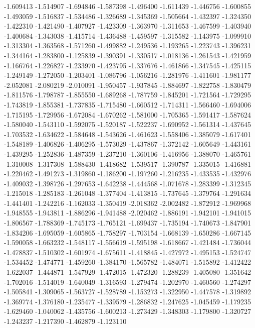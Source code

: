 -1.609413
-1.514907
-1.694846
-1.587398
-1.496400
-1.611439
-1.446756
-1.600855
-1.493059
-1.516837
-1.534486
-1.326689
-1.345369
-1.505664
-1.432397
-1.324350
-1.422310
-1.421490
-1.407927
-1.423309
-1.363970
-1.311653
-1.467599
-1.403940
-1.400684
-1.343038
-1.415714
-1.436488
-1.459597
-1.315582
-1.143975
-1.099910
-1.313304
-1.363568
-1.571260
-1.499882
-1.249536
-1.193265
-1.223743
-1.396231
-1.344164
-1.283800
-1.125839
-1.390391
-1.330517
-1.018136
-1.261543
-1.421959
-1.166764
-1.226827
-1.233970
-1.423795
-1.337676
-1.461866
-1.347545
-1.425115
-1.249149
-1.272050
-1.203401
-1.086796
-1.056216
-1.281976
-1.411601
-1.981177
-2.052081
-2.080219
-2.010091
-1.950457
-1.937845
-1.884697
-1.822758
-1.830479
-1.811576
-1.798787
-1.855550
-1.689268
-1.787759
-1.845201
-1.721564
-1.729295
-1.743819
-1.855381
-1.737835
-1.715480
-1.660512
-1.714311
-1.566460
-1.694006
-1.715195
-1.729956
-1.672084
-1.670262
-1.581000
-1.705365
-1.591417
-1.587624
-1.580040
-1.543110
-1.592075
-1.520187
-1.522237
-1.690952
-1.561314
-1.437645
-1.703532
-1.634622
-1.584648
-1.543626
-1.461623
-1.558406
-1.385079
-1.617401
-1.548189
-1.406826
-1.406295
-1.573029
-1.437867
-1.372142
-1.605649
-1.443161
-1.439295
-1.252836
-1.487359
-1.237210
-1.360106
-1.416956
-1.388070
-1.465761
-1.310008
-1.317308
-1.588430
-1.418682
-1.539517
-1.390787
-1.335015
-1.416881
-1.220462
-1.491273
-1.319860
-1.186200
-1.197260
-1.216235
-1.433535
-1.432976
-1.409032
-1.398726
-1.297653
-1.642238
-1.444568
-1.071678
-1.283399
-1.312345
-1.215018
-1.285183
-1.261048
-1.377404
-1.413815
-1.737645
-1.379764
-1.291634
-1.441401
-1.242216
-1.162033
-1.350419
-2.018362
-2.002482
-1.872912
-1.969968
-1.948555
-1.943811
-1.886296
-1.941488
-2.020462
-1.886191
-1.942101
-1.941015
-1.806567
-1.788369
-1.745173
-1.765121
-1.699437
-1.735194
-1.740673
-1.847901
-1.834206
-1.695059
-1.605865
-1.758297
-1.703154
-1.668139
-1.650286
-1.667145
-1.590058
-1.663232
-1.548117
-1.556619
-1.595198
-1.618667
-1.421484
-1.736044
-1.478837
-1.510302
-1.601974
-1.675611
-1.418845
-1.427972
-1.495153
-1.524747
-1.534452
-1.474771
-1.459260
-1.384170
-1.565782
-1.484071
-1.515892
-1.412422
-1.622037
-1.444871
-1.547929
-1.472015
-1.472320
-1.288239
-1.405080
-1.351642
-1.702016
-1.514019
-1.640049
-1.316593
-1.279474
-1.202970
-1.460560
-1.274297
-1.505841
-1.309065
-1.563727
-1.528789
-1.153273
-1.322950
-1.447578
-1.319892
-1.369774
-1.376180
-1.235477
-1.339579
-1.286832
-1.247625
-1.045459
-1.179235
-1.629460
-1.040062
-1.435756
-1.600213
-1.273429
-1.348303
-1.179800
-1.320727
-1.243237
-1.217390
-1.462879
-1.123110
